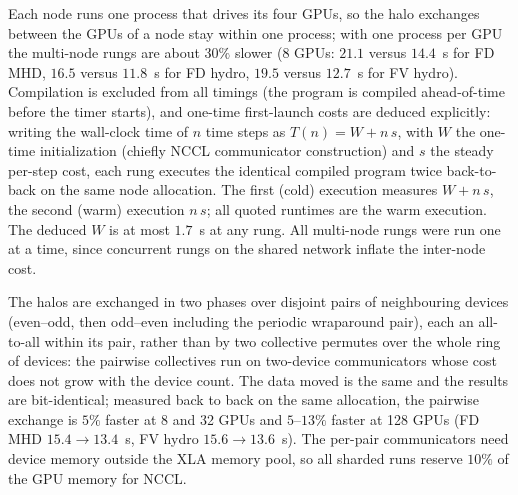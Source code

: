 Each node runs one process that drives its four GPUs, so the halo exchanges
between the GPUs of a node stay within one process; with one process per
GPU the multi-node rungs are about $30\%$ slower (8 GPUs: $21.1$ versus
$14.4$~s for FD MHD, $16.5$ versus $11.8$~s for FD hydro, $19.5$ versus
$12.7$~s for FV hydro).  Compilation is excluded from all timings (the
program is compiled ahead-of-time before the timer starts), and one-time
first-launch costs are deduced explicitly: writing the wall-clock time of
$n$ time steps as $T(n)=W+n\,s$, with $W$ the one-time initialization
(chiefly NCCL communicator construction) and $s$ the steady per-step cost,
each rung executes the identical compiled program twice back-to-back on
the same node allocation.  The first (cold) execution measures $W+n\,s$,
the second (warm) execution $n\,s$; all quoted runtimes are the warm
execution.  The deduced $W$ is at most $1.7$~s at any rung.  All
multi-node rungs were run one at a time, since concurrent rungs on the
shared network inflate the inter-node cost.

The halos are exchanged in two phases over disjoint pairs of neighbouring
devices (even--odd, then odd--even including the periodic wraparound pair),
each an all-to-all within its pair, rather than by two collective permutes
over the whole ring of devices: the pairwise collectives run on two-device
communicators whose cost does not grow with the device count.  The data
moved is the same and the results are bit-identical; measured back to back
on the same allocation, the pairwise exchange is $5\%$ faster at 8 and 32
GPUs and $5$--$13\%$ faster at 128 GPUs (FD MHD $15.4\to13.4$~s, FV hydro
$15.6\to13.6$~s).  The per-pair communicators need device memory outside the
XLA memory pool, so all sharded runs reserve $10\%$ of the GPU memory for
NCCL.

